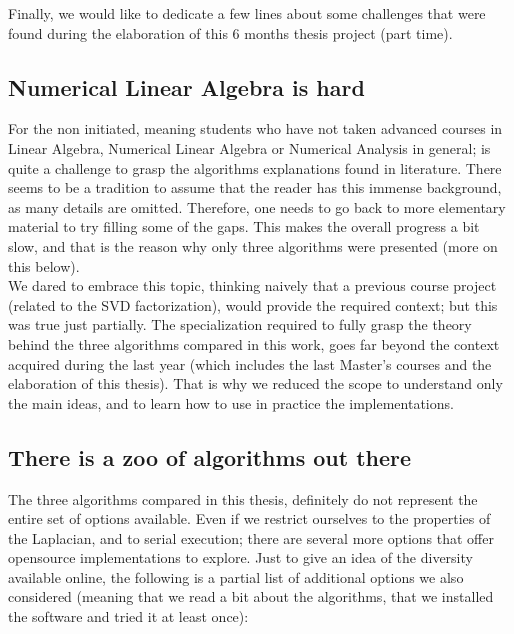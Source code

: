 Finally, we would like to dedicate a few lines about some challenges
that were found during the elaboration of this 6 months thesis
project (part time).

\subsection{Numerical Linear Algebra is hard}

For the non initiated, meaning students who have not taken advanced
courses in Linear Algebra,  Numerical Linear Algebra or Numerical
Analysis in general; is quite a challenge to grasp the algorithms
explanations found in literature. There seems to be a tradition to
assume that the reader has this immense background, as many details
are omitted. Therefore, one needs to go back to more elementary
material to try filling some of the gaps. This makes the overall
progress a bit slow, and that is the reason why only three algorithms
were presented (more on this below). \\

We dared to embrace this topic, thinking naively that a previous
course project (related to the SVD factorization), would provide
the required context; but this was 
true just partially. The specialization required to fully grasp the
theory behind the three algorithms compared in this work, goes far beyond
the context acquired during the last year (which includes the last
Master's courses and the elaboration of this thesis). That is why we
reduced the scope to understand only the main ideas, and to learn how
to use in practice the implementations.


\subsection{There is a zoo of algorithms out there}

The three algorithms compared in this thesis, definitely do not represent
the entire set of options available. Even if we restrict ourselves to
the properties of the \gls{Laplacian}, and to serial execution; there are
several more options that offer opensource implementations to
explore. Just to give an idea of the diversity available online, the
following is a partial list of additional options we also considered
(meaning that we read a bit about the algorithms, that we installed
the software and tried it at least once):

